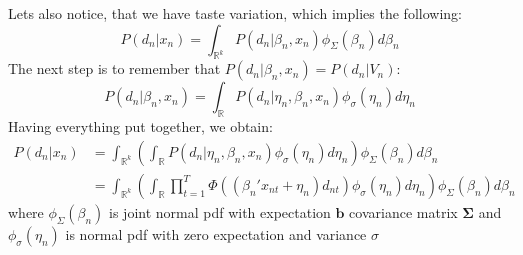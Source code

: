 \documentclass[11pt,a4paper]{article}
\begin{document}
Lets also notice, that we have taste variation, which implies the following:
$$
    P(d_n |x_n) = \int_{\mathbb{R}^k} P(d_n |\beta_n, x_n)\phi_{\Sigma}
    (\beta_n)d\beta_n
$$
The next step is to remember that $P(d_n |\beta_n, x_n) = P(d_n | V_n)$:
$$
    P(d_n |\beta_n, x_n) = \int_{\mathbb{R}} P(d_n |\eta_n, \beta_n, x_n)
    \phi_{\sigma}(\eta_n)d\eta_n
$$
Having everything put together, we obtain:
\begin{align*}
    P(d_n |x_n) & = \int_{\mathbb{R}^k} \left(\int_{\mathbb{R}}
    P(d_n |\eta_n, \beta_n, x_n) \phi_{\sigma}(\eta_n)d\eta_n \right)
    \phi_{\Sigma}(\beta_n)d\beta_n                              \\
                & =\int_{\mathbb{R}^k}\left(\int_{\mathbb{R}}
    \prod_{t=1}^{T}\Phi((\beta_n'x_{nt} + \eta_n)d_{nt})
    \phi_{\sigma}(\eta_n)d\eta_n \right)\phi_{\Sigma}(\beta_{n})
    d\beta_{n}
\end{align*}
where $\phi_{\Sigma}(\beta_n)$ is joint normal pdf with expectation $\pmb{b}$
covariance matrix $\pmb\Sigma$ and $\phi_{\sigma}(\eta_n)$ is normal pdf with
zero expectation and variance $\sigma$
\end{document}
